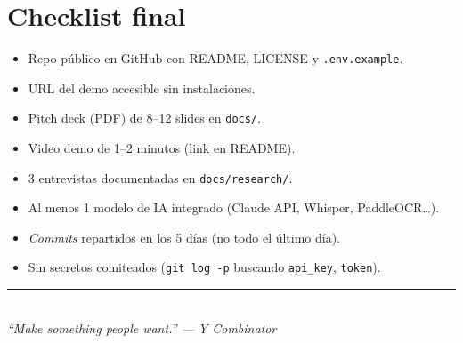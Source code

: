 \documentclass[10.5pt,a4paper]{article}
\begin{document}
\section{Checklist final}

\begin{itemize}[leftmargin=1.5em,label=$\square$,itemsep=0pt,topsep=1pt]
  \item Repo p\'ublico en GitHub con README, LICENSE y \texttt{.env.example}.
  \item URL del demo accesible sin instalaciones.
  \item Pitch deck (PDF) de 8--12 slides en \texttt{docs/}.
  \item Video demo de 1--2 minutos (link en README).
  \item 3 entrevistas documentadas en \texttt{docs/research/}.
  \item Al menos 1 modelo de IA integrado (Claude API, Whisper, PaddleOCR\ldots).
  \item \emph{Commits} repartidos en los 5 d\'ias (no todo el \'ultimo d\'ia).
  \item Sin secretos comiteados (\texttt{git log -p} buscando \texttt{api\_key}, \texttt{token}).
\end{itemize}

\vspace{6pt}
\begin{center}
{\color{clawOrange}\rule{0.55\linewidth}{0.8pt}}\\[4pt]
{\small\itshape\color{clawGray} ``Make something people want.'' --- Y Combinator}
\end{center}
\end{document}
